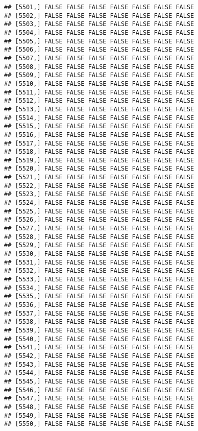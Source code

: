 \documentclass[
]{article}
\begin{document}
\begin{verbatim}
## [5501,] FALSE FALSE FALSE FALSE FALSE FALSE FALSE
## [5502,] FALSE FALSE FALSE FALSE FALSE FALSE FALSE
## [5503,] FALSE FALSE FALSE FALSE FALSE FALSE FALSE
## [5504,] FALSE FALSE FALSE FALSE FALSE FALSE FALSE
## [5505,] FALSE FALSE FALSE FALSE FALSE FALSE FALSE
## [5506,] FALSE FALSE FALSE FALSE FALSE FALSE FALSE
## [5507,] FALSE FALSE FALSE FALSE FALSE FALSE FALSE
## [5508,] FALSE FALSE FALSE FALSE FALSE FALSE FALSE
## [5509,] FALSE FALSE FALSE FALSE FALSE FALSE FALSE
## [5510,] FALSE FALSE FALSE FALSE FALSE FALSE FALSE
## [5511,] FALSE FALSE FALSE FALSE FALSE FALSE FALSE
## [5512,] FALSE FALSE FALSE FALSE FALSE FALSE FALSE
## [5513,] FALSE FALSE FALSE FALSE FALSE FALSE FALSE
## [5514,] FALSE FALSE FALSE FALSE FALSE FALSE FALSE
## [5515,] FALSE FALSE FALSE FALSE FALSE FALSE FALSE
## [5516,] FALSE FALSE FALSE FALSE FALSE FALSE FALSE
## [5517,] FALSE FALSE FALSE FALSE FALSE FALSE FALSE
## [5518,] FALSE FALSE FALSE FALSE FALSE FALSE FALSE
## [5519,] FALSE FALSE FALSE FALSE FALSE FALSE FALSE
## [5520,] FALSE FALSE FALSE FALSE FALSE FALSE FALSE
## [5521,] FALSE FALSE FALSE FALSE FALSE FALSE FALSE
## [5522,] FALSE FALSE FALSE FALSE FALSE FALSE FALSE
## [5523,] FALSE FALSE FALSE FALSE FALSE FALSE FALSE
## [5524,] FALSE FALSE FALSE FALSE FALSE FALSE FALSE
## [5525,] FALSE FALSE FALSE FALSE FALSE FALSE FALSE
## [5526,] FALSE FALSE FALSE FALSE FALSE FALSE FALSE
## [5527,] FALSE FALSE FALSE FALSE FALSE FALSE FALSE
## [5528,] FALSE FALSE FALSE FALSE FALSE FALSE FALSE
## [5529,] FALSE FALSE FALSE FALSE FALSE FALSE FALSE
## [5530,] FALSE FALSE FALSE FALSE FALSE FALSE FALSE
## [5531,] FALSE FALSE FALSE FALSE FALSE FALSE FALSE
## [5532,] FALSE FALSE FALSE FALSE FALSE FALSE FALSE
## [5533,] FALSE FALSE FALSE FALSE FALSE FALSE FALSE
## [5534,] FALSE FALSE FALSE FALSE FALSE FALSE FALSE
## [5535,] FALSE FALSE FALSE FALSE FALSE FALSE FALSE
## [5536,] FALSE FALSE FALSE FALSE FALSE FALSE FALSE
## [5537,] FALSE FALSE FALSE FALSE FALSE FALSE FALSE
## [5538,] FALSE FALSE FALSE FALSE FALSE FALSE FALSE
## [5539,] FALSE FALSE FALSE FALSE FALSE FALSE FALSE
## [5540,] FALSE FALSE FALSE FALSE FALSE FALSE FALSE
## [5541,] FALSE FALSE FALSE FALSE FALSE FALSE FALSE
## [5542,] FALSE FALSE FALSE FALSE FALSE FALSE FALSE
## [5543,] FALSE FALSE FALSE FALSE FALSE FALSE FALSE
## [5544,] FALSE FALSE FALSE FALSE FALSE FALSE FALSE
## [5545,] FALSE FALSE FALSE FALSE FALSE FALSE FALSE
## [5546,] FALSE FALSE FALSE FALSE FALSE FALSE FALSE
## [5547,] FALSE FALSE FALSE FALSE FALSE FALSE FALSE
## [5548,] FALSE FALSE FALSE FALSE FALSE FALSE FALSE
## [5549,] FALSE FALSE FALSE FALSE FALSE FALSE FALSE
## [5550,] FALSE FALSE FALSE FALSE FALSE FALSE FALSE

\end{verbatim}
\end{document}
